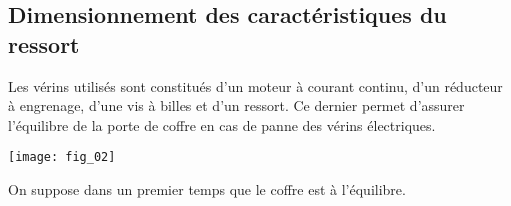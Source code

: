 \subsection*{Dimensionnement des caractéristiques du ressort}

\ifprof
\else
Les vérins utilisés sont constitués d’un moteur à courant continu, d’un réducteur à engrenage, d’une vis à billes et d’un ressort. Ce dernier permet d'assurer l'équilibre de la porte de coffre en cas de panne des vérins électriques. 

\begin{center}
\texttt{[image: fig\_02]}
\end{center}


On suppose dans un premier temps que le coffre est à l’équilibre.
\fi

